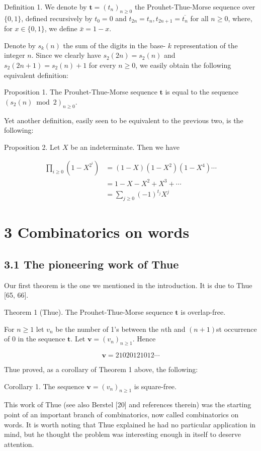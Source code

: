\documentclass[10pt]{article}
\begin{document}
Definition 1. We denote by $\mathbf{t}=\left(t_{n}\right)_{n \geq 0}$ the Prouhet-Thue-Morse sequence over $\{0,1\}$, defined recursively by $t_{0}=0$ and $t_{2 n}=t_{n}, t_{2 n+1}=\overline{t_{n}}$ for all $n \geq 0$, where, for $x \in\{0,1\}$, we define $\bar{x}=1-x$.

Denote by $s_{k}(n)$ the sum of the digits in the base- $k$ representation of the integer $n$. Since we clearly have $s_{2}(2 n)=s_{2}(n)$ and $s_{2}(2 n+1)=s_{2}(n)+1$ for every $n \geq 0$, we easily obtain the following equivalent definition:

Proposition 1. The Prouhet-Thue-Morse sequence $\mathbf{t}$ is equal to the sequence $\left(s_{2}(n) \bmod 2\right)_{n \geq 0}$.

Yet another definition, easily seen to be equivalent to the previous two, is the following:

Proposition 2. Let $X$ be an indeterminate. Then we have

\[
\begin{aligned}
\prod_{i \geq 0}\left(1-X^{2^{i}}\right) & =(1-X)\left(1-X^{2}\right)\left(1-X^{4}\right) \cdots \\
& =1-X-X^{2}+X^{3}+\cdots \\
& =\sum_{j \geq 0}(-1)^{t_{j}} X^{j}
\end{aligned}
\]

\section*{3 Combinatorics on words}
\subsection*{3.1 The pioneering work of Thue}
Our first theorem is the one we mentioned in the introduction. It is due to Thue [65, 66].

Theorem 1 (Thue). The Prouhet-Thue-Morse sequence $\mathbf{t}$ is overlap-free.

For $n \geq 1$ let $v_{n}$ be the number of 1's between the $n$th and $(n+1)$st occurrence of 0 in the sequence $\mathbf{t}$. Let $\mathbf{v}=\left(v_{n}\right)_{n \geq 1}$. Hence

\[
\mathbf{v}=21020121012 \cdots
\]

Thue proved, as a corollary of Theorem 1 above, the following:

Corollary 1. The sequence $\mathbf{v}=\left(v_{n}\right)_{n \geq 1}$ is square-free.


This work of Thue (see also Berstel [20] and references therein) was the starting point of an important branch of combinatorics, now called combinatorics on words. It is worth noting that Thue explained he had no particular application in mind, but he thought the problem was interesting enough in itself to deserve attention.
\end{document}
